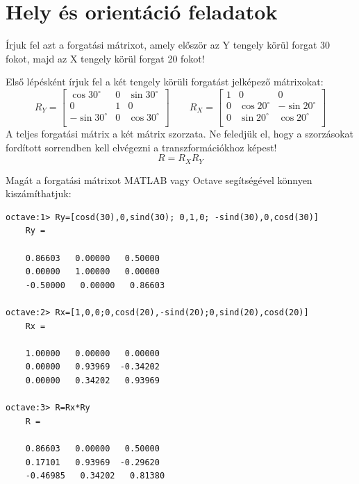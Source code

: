 \section{Hely és orientáció feladatok}

\begin{execise}
	Írjuk fel azt a forgatási mátrixot, amely először az Y tengely körül forgat 30 fokot, majd az X tengely körül forgat 20 fokot!
\end{execise}
\begin{answer}
	Első lépésként írjuk fel a két tengely körüli forgatást jelképező mátrixokat:
	\begin{equation*}
		R_Y=\begin{bmatrix}
			\cos 30^\circ & 0 & \sin 30^\circ \\
			0 & 1 & 0 \\
			-\sin 30^\circ & 0 & \cos 30^\circ \\
		\end{bmatrix}
		\qquad
		R_X=\begin{bmatrix}
		1 & 0 & 0 \\
		0 & \cos 20^\circ & -\sin 20^\circ \\
		0 & \sin 20^\circ & \cos 20^\circ \\
		\end{bmatrix}
	\end{equation*}
	A teljes forgatási mátrix a két mátrix szorzata. Ne feledjük el, hogy a szorzásokat fordított sorrendben kell elvégezni a transzformációkhoz képest!
	\begin{equation*}
	R = R_X R_Y
	\end{equation*}
	
	Magát a forgatási mátrixot MATLAB vagy Octave segítségével könnyen kiszámíthatjuk:
	\begin{lstlisting}
octave:1> Ry=[cosd(30),0,sind(30); 0,1,0; -sind(30),0,cosd(30)]
	Ry =
	
	0.86603   0.00000   0.50000
	0.00000   1.00000   0.00000
	-0.50000   0.00000   0.86603
	
octave:2> Rx=[1,0,0;0,cosd(20),-sind(20);0,sind(20),cosd(20)]
	Rx =
	
	1.00000   0.00000   0.00000
	0.00000   0.93969  -0.34202
	0.00000   0.34202   0.93969
	
octave:3> R=Rx*Ry
	R =
	
	0.86603   0.00000   0.50000
	0.17101   0.93969  -0.29620
	-0.46985   0.34202   0.81380
	\end{lstlisting}
\end{answer}

